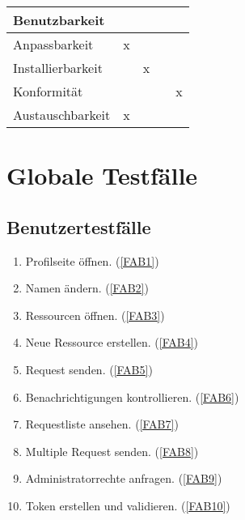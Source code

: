 \documentclass[parskip=full,11pt]{scrartcl}
\def\threedigits#1{%
  \ifnum#1<10 0\fi
  \ifnum#1<1 0\fi
  \number#1}
\begin{document}
\begin{table}[H]
\begin{center}
\begin{tabularx}{\textwidth}{X c c c c}
	  
	  \hline	  	
	  \multicolumn{5}{l}{\textbf{Benutzbarkeit}}\\
      \hline
      Anpassbarkeit & x &  &  & \\
	  Installierbarkeit &  & x &  & \\
	  Konformität &  &  &  & x\\
	  Austauschbarkeit & x &  &  & \\
	  
	  \hline      			
    \end{tabularx}
  \end{center}
  
\end{table}
\renewcommand{\arraystretch}{1}

\section{Globale Testfälle}
\subsection{Benutzertestfälle}
\begin{enumerate}[label={\textbf{/T\protect\threedigits{\theenumi}0/}}, leftmargin=*]
\item Profilseite öffnen. (\ref{FAB1})
\item Namen ändern. (\ref{FAB2})
\item Ressourcen öffnen. (\ref{FAB3})
\item Neue Ressource erstellen. (\ref{FAB4})
\item Request senden. (\ref{FAB5})
\item Benachrichtigungen kontrollieren. (\ref{FAB6})
\item Requestliste ansehen. (\ref{FAB7})
\item Multiple Request senden. (\ref{FAB8})
\item Administratorrechte anfragen. (\ref{FAB9})
\item Token erstellen und validieren. (\ref{FAB10})
\end{enumerate}
\end{document}
